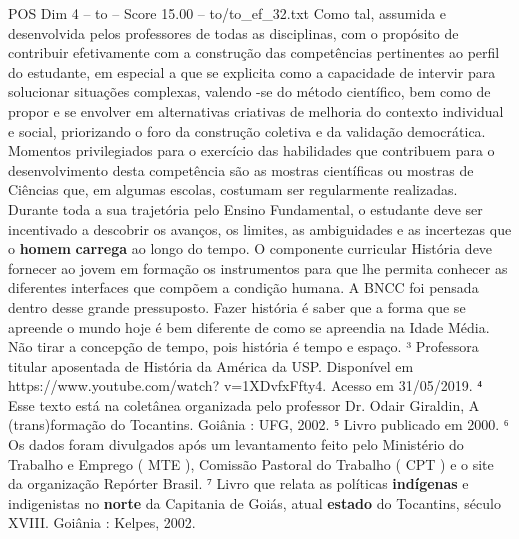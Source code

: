 \begin{textsample}{POS Dim 4 – to – Score 15.00 – to/to\_ef\_32.txt}
Como tal, assumida e desenvolvida pelos professores de todas as disciplinas, com o propósito de contribuir efetivamente com a construção das competências pertinentes ao perfil do estudante, em especial a que se explicita como a capacidade de intervir para solucionar situações complexas, valendo -se do método científico, bem como de propor e se envolver em alternativas criativas de melhoria do contexto individual e social, priorizando o foro da construção coletiva e da validação democrática.
Momentos privilegiados para o exercício das habilidades que contribuem para o desenvolvimento desta competência são as mostras científicas ou mostras de Ciências que, em algumas escolas, costumam ser regularmente realizadas.
Durante toda a sua trajetória pelo Ensino Fundamental, o estudante deve ser incentivado a descobrir os avanços, os limites, as ambiguidades e as incertezas que o \textbf{homem} \textbf{carrega} ao longo do tempo.
O componente curricular História deve fornecer ao jovem em formação os instrumentos para que lhe permita conhecer as diferentes interfaces que compõem a condição humana.
A BNCC foi pensada dentro desse grande pressuposto.
Fazer história é saber que a forma que se apreende o mundo hoje é bem diferente de como se apreendia na Idade Média.
Não tirar a concepção de tempo, pois história é tempo e espaço. ³ Professora titular aposentada de História da América da USP.
Disponível em https://www.youtube.com/watch? v=1XDvfxFfty4.
Acesso em 31/05/2019. ⁴ Esse texto está na coletânea organizada pelo professor Dr.
Odair Giraldin, A (trans)formação do Tocantins.
Goiânia : UFG, 2002. ⁵ Livro publicado em 2000. ⁶ Os dados foram divulgados após um levantamento feito pelo Ministério do Trabalho e Emprego ( MTE ), Comissão Pastoral do Trabalho ( CPT ) e o site da organização Repórter Brasil. ⁷ Livro que relata as políticas \textbf{indígenas} e indigenistas no \textbf{norte} da Capitania de Goiás, atual \textbf{estado} do Tocantins, século XVIII.
Goiânia : Kelpes, 2002.

\end{textsample}
